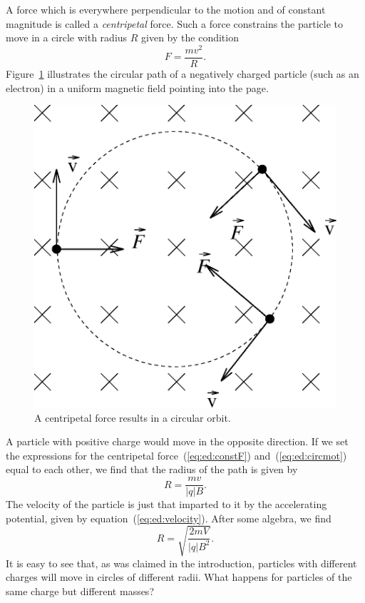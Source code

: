 A force which is everywhere perpendicular to the motion and of constant 
magnitude is called a {\it centripetal} force. Such a force constrains the 
particle to move in a circle with radius $R$ given by the condition
\begin{equation}
F=\frac{mv^2}{R}. \label{eq:ed:circmot}
\end{equation}   
Figure~\ref{fig:ed:circorb} illustrates the circular path of a negatively 
charged particle (such as an electron) in a uniform magnetic field pointing 
into the page. 
\begin{figure}[htb]
\centering \epsfxsize=7cm \includegraphics[scale=0.6]{3_electrondynamics/circorb.eps}
\caption{A centripetal force results in a circular orbit.}
\label{fig:ed:circorb}
\end{figure}
A particle with positive charge would move in the opposite 
direction. If we set the expressions for the centripetal 
force~(\ref{eq:ed:constF}) and~(\ref{eq:ed:circmot}) equal to each other, we 
find that the radius of the path is given by
$$
R=\frac{mv}{|q|B}.
$$
The velocity of the particle is just that imparted to it by the accelerating
potential, given by equation~(\ref{eq:ed:velocity}). After some algebra, we 
find
$$
R=\sqrt{\frac{2mV}{|q|B^2}}.
$$
It is easy to see that, as was claimed in the introduction, particles with
different charges will move in circles of different radii.  What happens for
particles of the same charge but different masses?

